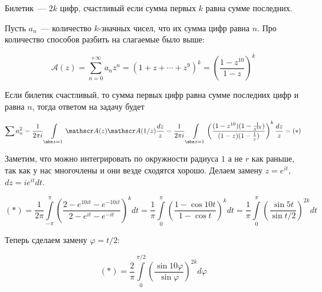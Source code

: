 \begin{example}

    Билетик~--- $2k$ цифр,
    счастливый если сумма первых $k$ равна сумме последних.

    Пусть $a_n$~--- количество $k$-значных чисел,
    что их сумма цифр равна $n$.
    Про количество способов разбить на слагаемые было выше:

    \[
        \mathscr A(z) = \sum\limits_{n=0}^{+\infty}
        a_nz^n = \left(1 + z + \cdots + z^9\right)^k
        = \left( \frac{1-z^{10}}{1-z}\right)^k
    \]

    Если билетик счастливый, то сумма первых цифр
    равна сумме последних цифр и равна $n$, тогда
    ответом на задачу будет

    \[
        \sum a_n^2 = \frac{1}{2\pi i}
        \int\limits_{\abs z = 1} \mathscr A(z)
        \mathscr A(1/z) \frac{dz}{z}
        = \frac{1}{2\pi i}
        \int\limits_{\abs z = 1}
        \left(\frac{(1-z^{10})(1-\frac{1}{z^{10}})}
        {(1-z)(1-\frac{1}{z})}\right)^k
        \frac{dz}{z} = (*)
    \]

    Заметим, что можно интегрировать по окружности
    радиуса $1$ а не $r$ как раньше, так как у нас многочлены
    и они везде сходятся хорошо. Делаем замену
    $z=e^{it}$, $dz = ie^{it}dt$.

    \[
        (*) = \frac{1}{2\pi}
        \int\limits_{-\pi}^{\pi} \left(\frac{2-e^{10it}-e^{-10it}}
        {2-e^{it}-e^{-it}}\right)^k dt
        = \frac{1}{\pi}
        \int\limits_0^{\pi} \left(\frac{1-\cos 10t}
        {1-\cos t}\right)^k dt
        = \frac{1}{\pi} \int\limits_0^{\pi}
        \left(
        \frac{\sin 5t}{\sin t/2}
        \right)^{2k} dt
    \]

    Теперь сделаем замену $\varphi = t/2$:

    \[
        (*) = \frac{2}{\pi} \int\limits_0^{\pi/2}
        \left(\frac{\sin 10 \varphi}{\sin \varphi}\right)^{2k} d\varphi
    \]
\end{example}

